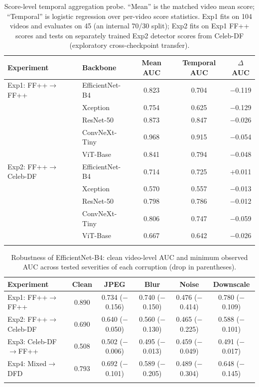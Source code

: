 \begin{table}[!htbp]
\caption{Score-level temporal aggregation probe. ``Mean'' is the matched video mean score; ``Temporal'' is logistic regression over per-video score statistics. Exp1 fits on 104 videos and evaluates on 45 (an internal 70/30 split); Exp2 fits on Exp1 FF++ scores and tests on separately trained Exp2 detector scores from Celeb-DF (exploratory cross-checkpoint transfer).}
\centering
\small
\setlength{\tabcolsep}{3pt}
\begin{tabular}{l l c c c}
\toprule
\textbf{Experiment} & \textbf{Backbone} & \textbf{Mean AUC} & \textbf{Temporal AUC} & \textbf{$\Delta$AUC} \\
\midrule
Exp1: FF++$\to$FF++ & EfficientNet-B4 & 0.823 & 0.704 & $-$0.119 \\
 & Xception & 0.754 & 0.625 & $-$0.129 \\
 & ResNet-50 & 0.873 & 0.847 & $-$0.026 \\
 & ConvNeXt-Tiny & 0.968 & 0.915 & $-$0.054 \\
 & ViT-Base & 0.841 & 0.794 & $-$0.048 \\
\midrule
Exp2: FF++$\to$Celeb-DF & EfficientNet-B4 & 0.714 & 0.725 & $+$0.011 \\
 & Xception & 0.570 & 0.557 & $-$0.013 \\
 & ResNet-50 & 0.798 & 0.786 & $-$0.012 \\
 & ConvNeXt-Tiny & 0.806 & 0.747 & $-$0.059 \\
 & ViT-Base & 0.667 & 0.642 & $-$0.026 \\
\botrule
\end{tabular}
\label{tab:temporal_score_probe}
\end{table}

\begin{table}[!htbp]
\caption{Robustness of EfficientNet-B4: clean video-level AUC and minimum observed AUC across tested severities of each corruption (drop in parentheses).}
\centering
\small
\setlength{\tabcolsep}{3pt}
\begin{tabular}{l c cccc}
\toprule
\textbf{Experiment} & \textbf{Clean} & \textbf{JPEG} & \textbf{Blur} & \textbf{Noise} & \textbf{Downscale} \\
\midrule
Exp1: FF++$\to$FF++ & 0.890 & 0.734 ($-$0.156) & 0.740 ($-$0.150) & 0.476 ($-$0.414) & 0.780 ($-$0.109) \\
Exp2: FF++$\to$Celeb-DF & 0.690 & 0.640 ($-$0.050) & 0.560 ($-$0.130) & 0.465 ($-$0.225) & 0.588 ($-$0.101) \\
Exp3: Celeb-DF$\to$FF++ & 0.508 & 0.502 ($-$0.006) & 0.495 ($-$0.013) & 0.459 ($-$0.049) & 0.491 ($-$0.017) \\
Exp4: Mixed$\to$DFD & 0.793 & 0.692 ($-$0.101) & 0.589 ($-$0.205) & 0.489 ($-$0.304) & 0.648 ($-$0.145) \\
\botrule
\end{tabular}
\label{tab:robust}
\end{table}

